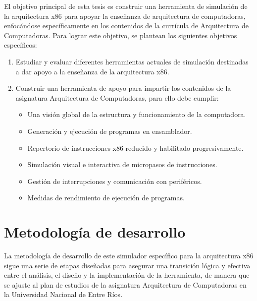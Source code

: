 \documentclass[12pt,oneside]{templates/unerthesis}
\providecommand{\tightlist}{%
  \setlength{\itemsep}{0pt}\setlength{\parskip}{0pt}}
\begin{document}
El objetivo principal de esta tesis es construir una herramienta de simulación de la arquitectura x86 para apoyar la enseñanza de arquitectura de computadoras, enfocándose específicamente en los contenidos de la currícula de Arquitectura de Computadoras. Para lograr este objetivo, se plantean los siguientes objetivos específicos:

\begin{enumerate}
\def\labelenumi{\arabic{enumi}.}
\tightlist
\item
  Estudiar y evaluar diferentes herramientas actuales de simulación destinadas a dar apoyo a la enseñanza de la arquitectura x86.
\item
  Construir una herramienta de apoyo para impartir los contenidos de la asignatura Arquitectura de Computadoras, para ello debe cumplir:

  \begin{itemize}
  \tightlist
  \item
    Una visión global de la estructura y funcionamiento de la computadora.
  \item
    Generación y ejecución de programas en ensamblador.
  \item
    Repertorio de instrucciones x86 reducido y habilitado progresivamente.
  \item
    Simulación visual e interactiva de micropasos de instrucciones.
  \item
    Gestión de interrupciones y comunicación con periféricos.
  \item
    Medidas de rendimiento de ejecución de programas.
  \end{itemize}
\end{enumerate}

\hypertarget{metodologuxeda-de-desarrollo}{%
\section{Metodología de desarrollo}\label{metodologuxeda-de-desarrollo}}

La metodología de desarrollo de este simulador específico para la arquitectura x86 sigue una serie de etapas diseñadas para asegurar una transición lógica y efectiva entre el análisis, el diseño y la implementación de la herramienta, de manera que se ajuste al plan de estudios de la asignatura Arquitectura de Computadoras en la Universidad Nacional de Entre Ríos.
\end{document}
